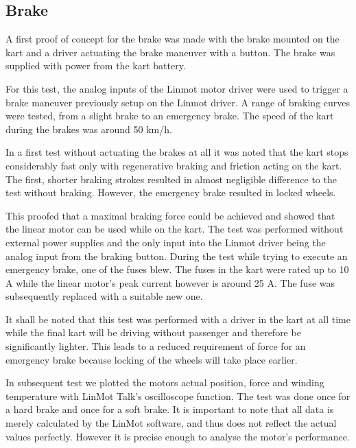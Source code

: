 \subsection{Brake}
A first proof of concept for the brake was made with the brake mounted on the kart and a driver actuating the brake maneuver with a button.
The brake was supplied with power from the kart battery.


For this test, the analog inputs of the Linmot motor driver were used to trigger a brake maneuver previously setup on the Linmot driver. A range of braking curves were tested, from a slight brake to an emergency brake. The speed of the kart during the brakes was around 50 km/h.

In a first test without actuating the brakes at all it was noted that the kart stops considerably fast only with regenerative braking and friction acting on the kart.
The first, shorter braking strokes resulted in almost negligible difference to the test without braking.
However, the emergency brake resulted in locked wheels.

This proofed that a maximal braking force could be achieved and showed that the linear motor can be used while on the kart. The test was performed without external power supplies and the only input into the Linmot driver being the analog input from the braking button. During the test while trying to execute an emergency brake, one of the fuses blew. The fuses in the kart were rated up to 10 A while the linear motor's peak current however is around 25 A. The fuse was subsequently replaced with a suitable new one. 
 
It shall be noted that this test was performed with a driver in the kart at all time while the final kart will be driving without passenger and therefore be significantly lighter. This leads to a reduced requirement of force for an emergency brake because locking of the wheels will take place earlier.

In subsequent test we plotted the motors actual position, force and winding temperature with LinMot Talk's oscilloscope function. The test was done once for a hard brake and once for a soft brake. It is important to note that all data is merely calculated by the LinMot software, and thus does not reflect the actual values perfectly. However it is precise enough to analyse the motor's performance.

